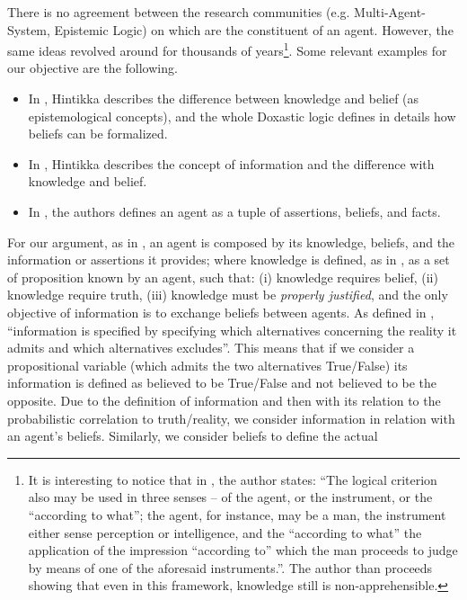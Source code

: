 \documentclass[conference]{IEEEtran}
\begin{document}
There is no agreement between the research communities (e.g.
Multi-Agent-System, Epistemic Logic) on which are the constituent of an agent.
However, the same ideas revolved around for thousands of years\footnote{
It is interesting to notice that 
in \autocite{Empiricus1990Pyrrhonism}, the author states: ``The
 logical criterion also may be used in three senses -- of the
 agent, or the instrument, or the ``according to what''; the
 agent, for instance, may be a man, the instrument either sense
 perception or intelligence, and the ``according to what'' the
 application of the impression ``according to'' which the man
 proceeds to judge by means of one of the aforesaid
 instruments.''. The author than proceeds showing that
 even in this framework, knowledge still is non-apprehensible.
}.
Some relevant examples for our objective are the following.
\begin{itemize}
	\item In \autocite{Hintikka1962knowledge}, Hintikka describes the
		difference between knowledge and belief (as epistemological
		concepts), and the whole Doxastic logic defines in details how
		beliefs can be formalized.
	\item In \autocite{Hintikka1993Information}, Hintikka describes the concept
		of information and the difference with knowledge and belief.
	\item In \autocite{Santaca2016abf}, the authors defines an agent as a
		tuple of assertions, beliefs, and facts.
\end{itemize}
For our argument, as in \autocite{Santaca2016abf}, an agent is composed by its
knowledge, beliefs, and the information or assertions it provides; where
knowledge is defined, as in \autocite{Steup2020epistemology}, as a set of
proposition known by an agent, such that: (i) knowledge requires belief, (ii)
knowledge require truth, (iii) knowledge must be \emph{properly justified}, and
the only objective of information is to exchange beliefs between agents.  As
defined in \autocite{Hintikka1993Information}, ``information is specified by
specifying which alternatives concerning the reality it admits and which
alternatives excludes''. This means that if we consider a propositional
variable (which admits the two alternatives True/False) its information is
defined as believed to be True/False and not believed to be the opposite.  Due
to the definition of information and then with its relation to the
probabilistic correlation to truth/reality, we consider information in relation
with an agent's beliefs. Similarly, we consider beliefs to define the actual
\end{document}
